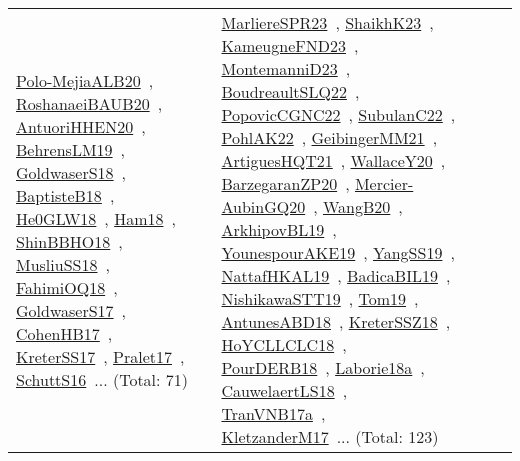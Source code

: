{\begin{longtable}{lp{3cm}>{\raggedright\arraybackslash}p{6cm}>{\raggedright\arraybackslash}p{6cm}>{\raggedright\arraybackslash}p{8cm}}
\href{../works/Polo-MejiaALB20.pdf}{Polo-MejiaALB20}~\cite{Polo-MejiaALB20}, \href{../works/RoshanaeiBAUB20.pdf}{RoshanaeiBAUB20}~\cite{RoshanaeiBAUB20}, \href{../works/AntuoriHHEN20.pdf}{AntuoriHHEN20}~\cite{AntuoriHHEN20}, \href{../works/BehrensLM19.pdf}{BehrensLM19}~\cite{BehrensLM19}, \href{../works/GoldwaserS18.pdf}{GoldwaserS18}~\cite{GoldwaserS18}, \href{../works/BaptisteB18.pdf}{BaptisteB18}~\cite{BaptisteB18}, \href{../works/He0GLW18.pdf}{He0GLW18}~\cite{He0GLW18}, \href{../works/Ham18.pdf}{Ham18}~\cite{Ham18}, \href{../works/ShinBBHO18.pdf}{ShinBBHO18}~\cite{ShinBBHO18}, \href{../works/MusliuSS18.pdf}{MusliuSS18}~\cite{MusliuSS18}, \href{../works/FahimiOQ18.pdf}{FahimiOQ18}~\cite{FahimiOQ18}, \href{../works/GoldwaserS17.pdf}{GoldwaserS17}~\cite{GoldwaserS17}, \href{../works/CohenHB17.pdf}{CohenHB17}~\cite{CohenHB17}, \href{../works/KreterSS17.pdf}{KreterSS17}~\cite{KreterSS17}, \href{../works/Pralet17.pdf}{Pralet17}~\cite{Pralet17}, \href{../works/SchuttS16.pdf}{SchuttS16}~\cite{SchuttS16}... (Total: 71) & \href{../works/MarliereSPR23.pdf}{MarliereSPR23}~\cite{MarliereSPR23}, \href{../works/ShaikhK23.pdf}{ShaikhK23}~\cite{ShaikhK23}, \href{../works/KameugneFND23.pdf}{KameugneFND23}~\cite{KameugneFND23}, \href{../works/MontemanniD23.pdf}{MontemanniD23}~\cite{MontemanniD23}, \href{../works/BoudreaultSLQ22.pdf}{BoudreaultSLQ22}~\cite{BoudreaultSLQ22}, \href{../works/PopovicCGNC22.pdf}{PopovicCGNC22}~\cite{PopovicCGNC22}, \href{../works/SubulanC22.pdf}{SubulanC22}~\cite{SubulanC22}, \href{../works/PohlAK22.pdf}{PohlAK22}~\cite{PohlAK22}, \href{../works/GeibingerMM21.pdf}{GeibingerMM21}~\cite{GeibingerMM21}, \href{../works/ArtiguesHQT21.pdf}{ArtiguesHQT21}~\cite{ArtiguesHQT21}, \href{../works/WallaceY20.pdf}{WallaceY20}~\cite{WallaceY20}, \href{../works/BarzegaranZP20.pdf}{BarzegaranZP20}~\cite{BarzegaranZP20}, \href{../works/Mercier-AubinGQ20.pdf}{Mercier-AubinGQ20}~\cite{Mercier-AubinGQ20}, \href{../works/WangB20.pdf}{WangB20}~\cite{WangB20}, \href{../works/ArkhipovBL19.pdf}{ArkhipovBL19}~\cite{ArkhipovBL19}, \href{../works/YounespourAKE19.pdf}{YounespourAKE19}~\cite{YounespourAKE19}, \href{../works/YangSS19.pdf}{YangSS19}~\cite{YangSS19}, \href{../works/NattafHKAL19.pdf}{NattafHKAL19}~\cite{NattafHKAL19}, \href{../works/BadicaBIL19.pdf}{BadicaBIL19}~\cite{BadicaBIL19}, \href{../works/NishikawaSTT19.pdf}{NishikawaSTT19}~\cite{NishikawaSTT19}, \href{../works/Tom19.pdf}{Tom19}~\cite{Tom19}, \href{../works/AntunesABD18.pdf}{AntunesABD18}~\cite{AntunesABD18}, \href{../works/KreterSSZ18.pdf}{KreterSSZ18}~\cite{KreterSSZ18}, \href{../works/HoYCLLCLC18.pdf}{HoYCLLCLC18}~\cite{HoYCLLCLC18}, \href{../works/PourDERB18.pdf}{PourDERB18}~\cite{PourDERB18}, \href{../works/Laborie18a.pdf}{Laborie18a}~\cite{Laborie18a}, \href{../works/CauwelaertLS18.pdf}{CauwelaertLS18}~\cite{CauwelaertLS18}, \href{../works/TranVNB17a.pdf}{TranVNB17a}~\cite{TranVNB17a}, \href{../works/KletzanderM17.pdf}{KletzanderM17}~\cite{KletzanderM17}... (Total: 123)\\

\end{longtable}}
